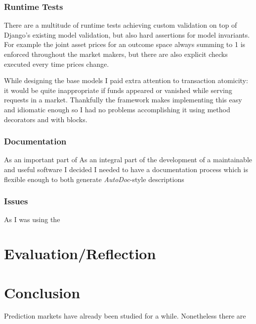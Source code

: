 \documentclass[bsc,frontabs,twoside,singlespacing,parskip,deptreport]{infthesis}     %
\begin{document}
\subsection{Runtime Tests}
    There are a multitude of runtime tests achieving custom validation on top of Django’s existing model validation, but also hard assertions for model invariants. For example the joint asset prices for an outcome space always summing to 1 is enforced throughout the market makers, but there are also explicit checks executed every time prices change.

    While designing the base models I paid extra attention to transaction atomicity: it would be quite inappropriate if funds appeared or vanished while serving requests in a market. Thankfully the framework makes implementing this easy and idiomatic enough so I had no problems accomplishing it using method decorators and with blocks.

\subsection{Documentation}
    As an important part of 
    As an integral part of the development of a maintainable and useful software I decided I needed to have a documentation process which is flexible enough to both generate {\em AutoDoc}-style descriptions   
    
\subsection{Issues}
    As I was using the 
\chapter{Evaluation/Reflection}

\chapter{Conclusion}
	Prediction markets have already been studied for a while. Nonetheless there are 






\end{document}
